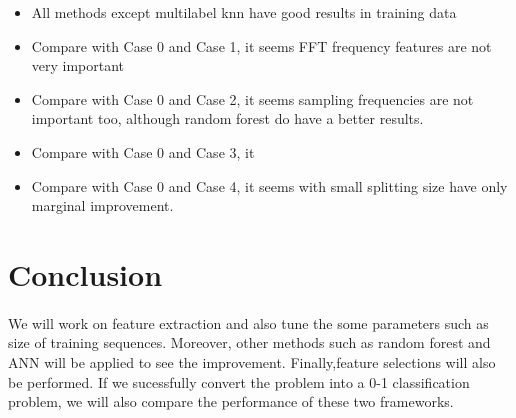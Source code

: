 \documentclass{article}
\begin{document}
	\begin{itemize}
		\item All methods except multilabel knn have good results in training data
		\item Compare with Case 0 and Case 1, it seems FFT frequency features are not very important
		\item Compare with Case 0 and Case 2, it seems sampling frequencies are not important too, although random forest do have a better results. 
		\item Compare with Case 0 and Case 3, it 
		\item Compare with Case 0 and Case 4, it seems with small splitting size have only marginal improvement. 
	\end{itemize}
	
	
	\section{Conclusion} %
	\label{sec:future_work}
	\paragraph{} We will work on feature extraction and also tune the some parameters such as size of training sequences. Moreover, other methods such as random forest and ANN will be applied to see the improvement. Finally,feature selections will also be performed. If we sucessfully convert the problem into a 0-1 classification problem, we will also compare the performance of these two frameworks.
	
\end{document}
